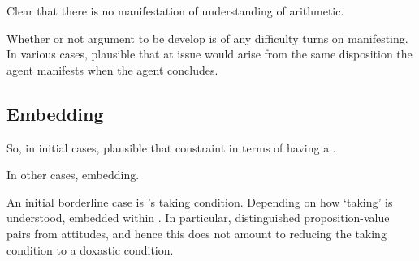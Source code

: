 \begin{note}[Illustration]
  Clear that there is no manifestation of understanding of arithmetic.
\end{note}

\begin{note}
  Whether or not argument to be develop is of any difficulty turns on manifesting.
  In various cases, plausible that  at issue would arise from the same disposition the agent manifests when the agent concludes.
\end{note}

\subsection{Embedding}
\label{sec:embedding}

\begin{note}
  So, in initial cases, plausible that constraint in terms of having a \wit{}.

  In other cases, embedding.
\end{note}

\begin{note}
  An initial borderline case is \citeauthor{Boghossian:2014aa}'s taking condition.
  Depending on how `taking' is understood, embedded within \ros{}.
  In particular, distinguished proposition-value pairs from attitudes, and hence this does not amount to reducing the taking condition to a doxastic condition.
\end{note}


\subsubsection{\textcite{Thomson:1965vv}}

